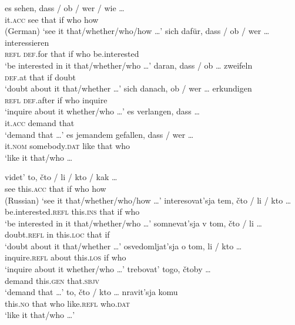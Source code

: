 \documentclass[output=paper,
colorlinks,
citecolor=brown,
newtxmath
]{langscibook}
\begin{document}
\ea\label{ex:3.1}
    \ea \gll es sehen, dass / ob / wer / wie {\dots} \\
    it.\textsc{acc} see that {} if {} who {} how \\ \hfill (German)
    \glt `see it that/whether/who/how {\dots}'
    \ex \gll sich dafür, dass / ob / wer {\dots} interessieren \\
    \textsc{refl} \textsc{def}.for that {} if {} who {} be.interested \\
    \glt `be interested in it that/whether/who {\dots}'
    \ex \gll daran, dass / ob {\dots} zweifeln \\
    \textsc{def}.at that {} if {} doubt \\
    \glt `doubt about it that/whether {\dots}'
    \ex \gll sich danach, ob / wer {\dots} erkundigen \\
    \textsc{refl} \textsc{def}.after if {} who {} inquire \\
    \glt `inquire about it whether/who {\dots}'
    \ex \gll es verlangen, dass {\dots} \\
    it.\textsc{acc} demand that {} \\
    \glt `demand that {\dots}'
    \ex \gll es jemandem gefallen, dass / wer {\dots} \\
    it.\textsc{nom} somebody.\textsc{dat} like that {} who {} \\
    \glt `like it that/who {\dots}
\z\z

\ea\label{ex:3.2}
    \ea \gll videt' to, čto / li / kto / kak {\dots} \\
    see this.\textsc{acc} that {} if {} who {} how {} \\ \hfill (Russian)
    \glt `see it that/whether/who/how {\dots}'
    \ex \gll interesovat'sja tem, čto / li / kto {\dots} \\
    be.interested.\textsc{refl} this.\textsc{ins} that {} if {} who {} \\
    \glt `be interested in it that/whether/who {\dots}'
    \ex \gll somnevat'sja v tom, čto / li {\dots} \\
    doubt.\textsc{refl} in this.\textsc{loc} that {} if {} \\
    \glt `doubt about it that/whether {\dots}'
    \ex \gll osvedomljat'sja o tom, li / kto {\dots} \\
    inquire.\textsc{refl} about this.\textsc{los} if {} who {} \\
    \glt `inquire about it whether/who {\dots}'
    \ex \gll trebovat' togo, čtoby {\dots} \\
    demand this.\textsc{gen} that.\textsc{sbjv} {} \\
    \glt `demand that {\dots}'
    \ex \gll to, čto / kto {\dots} nravit'sja komu \\
    this.\textsc{no} that {} who {} like.\textsc{refl} who.\textsc{dat} \\
    \glt `like it that/who {\dots}'
\z\z
\end{document}
